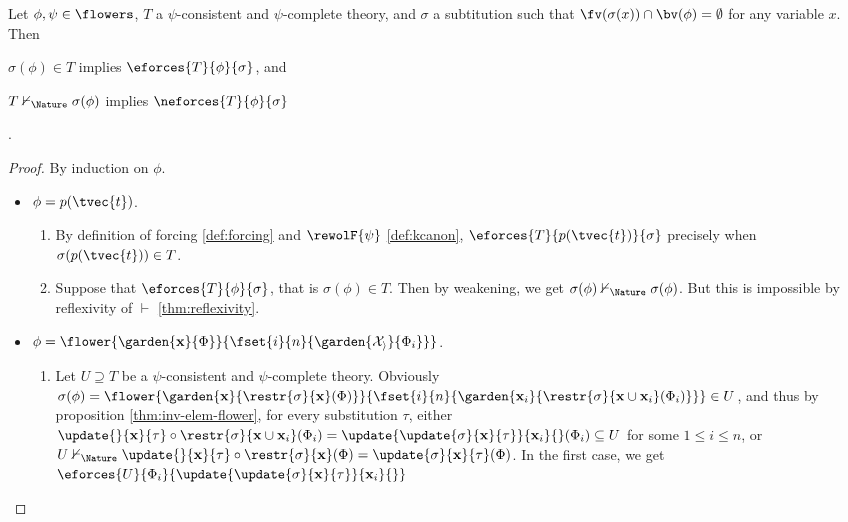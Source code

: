 \begin{lemma}[Adequacy]\label{thm:adequacy}

  Let $\phi, \psi \in \flowers$, $T$ a $\psi$-consistent and $\psi$-complete
  theory, and $\sigma$ a subtitution such that $\fv(\sigma(x)) \cap \bv(\phi) =
  \emptyset$ for any variable $x$. Then
  \begin{enumerate*}
    \item $\sigma(\phi) \in T$ implies $\eforces{T}{\phi}{\sigma}$, and
    \item $T \nvdash_\Nature \sigma(\phi)$ implies $\neforces{T}{\phi}{\sigma}$
  \end{enumerate*}.
\end{lemma}
\begin{proof}
  By induction on $\phi$.
  \begin{itemize}
    \item $\phi = p(\tvec{t})$.
    \begin{enumerate}
      \item By definition of forcing \ref{def:forcing} and $\rewolF{\psi}$
      \ref{def:kcanon}, $\eforces{T}{p(\tvec{t})}{\sigma}$ precisely when
      $\sigma(p(\tvec{t})) \in T$.
      \item Suppose that $\eforces{T}{\phi}{\sigma}$, that is $\sigma(\phi) \in
      T$. Then by weakening, we get $\sigma(\phi) \nvdash_\Nature \sigma(\phi)$. But
      this is impossible by reflexivity of $\vdash$ \ref{thm:reflexivity}.
    \end{enumerate}
    \item $\phi =
    \flower{\garden{\mathbf{x}}{\Phi}}{\fset{i}{n}{\garden{\mathcal{X_i}}{\Phi_i}}}$.
    \begin{enumerate}
      \item Let $U \supseteq T$ be a $\psi$-consistent and $\psi$-complete
      theory. Obviously $\sigma(\phi) =
      \flower{\garden{\mathbf{x}}{\restr{\sigma}{\mathbf{x}}(\Phi)}}{\fset{i}{n}{\garden{\mathbf{x}_i}{\restr{\sigma}{\mathbf{x}
      \cup \mathbf{x}_i}(\Phi_i)}}} \in U$, and thus by proposition
      \ref{thm:inv-elem-flower}, for every substitution $\tau$, either $
      \update{}{\mathbf{x}}{\tau} \circ \restr{\sigma}{\mathbf{x} \cup
      \mathbf{x}_i}(\Phi_i) =
      \update{\update{\sigma}{\mathbf{x}}{\tau}}{\mathbf{x}_i}{}(\Phi_i)
      \subseteq U$ for some $1 \leq i \leq n$, or $U \nvdash_\Nature \update{}{\mathbf{x}}{\tau} \circ
      \restr{\sigma}{\mathbf{x}}(\Phi) =
      \update{\sigma}{\mathbf{x}}{\tau}(\Phi)$. In the first case, we get
      $\eforces{U}{\Phi_i}{\update{\update{\sigma}{\mathbf{x}}{\tau}}{\mathbf{x}_i}{}}$

\end{enumerate}
\end{itemize}
\end{proof}
